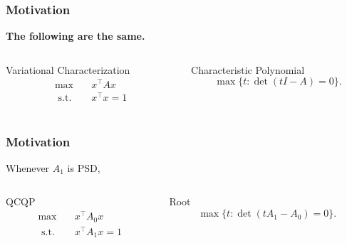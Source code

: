 \documentclass{beamer}
\newcommand{\st}{{\text{ s.t. }}}
\begin{document}
\begin{frame}
    \frametitle{Motivation}
    \textbf{The following are the same.}
    \vspace{0.3in}
    \begin{columns}
        \begin{column}{0.48\textwidth}
            \begin{block}{Variational Characterization}
            \begin{equation*}
                \begin{aligned}
                    \max\quad & x^{\intercal}Ax\\
                    \st & x^{\intercal}x = 1\\
                \end{aligned}
            \end{equation*}
            \end{block}
        \end{column}
        \begin{column}{0.48\textwidth}
            \begin{block}{Characteristic Polynomial}
            \[
                \max \{t : \det(tI - A) = 0\}.
            \]
            \end{block}
        \end{column}
    \end{columns}
\end{frame}
\begin{frame}
    \frametitle{Motivation}
    Whenever $A_1$ is PSD,
    \vspace{0.3in}
    \begin{columns}
        \begin{column}{0.48\textwidth}
            \begin{block}{QCQP}
            \begin{equation*}
                \begin{aligned}
                    \max\quad & x^{\intercal}A_0x\\
                    \st & x^{\intercal}A_1x = 1\\
                \end{aligned}
            \end{equation*}
            \end{block}
        \end{column}
        \begin{column}{0.48\textwidth}
            \begin{block}{Root}
            \[
                \max \{t : \det(tA_1 - A_0) = 0\}.
            \]
            \end{block}
        \end{column}
    \end{columns}
\end{frame}
\end{document}
